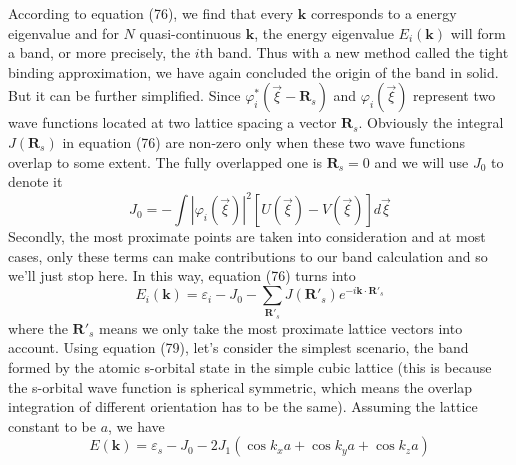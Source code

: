 \documentclass{article}
\begin{document}
According to equation (76), we find that every $\mathbf{k}$ corresponds to a energy eigenvalue and for $N$ quasi-continuous $\mathbf{k}$, the energy eigenvalue $E_i(\mathbf{k})$ will form a band, or more precisely, the $i$th band. Thus with a new method called the tight binding approximation, we have again concluded the origin of the band in solid. But it can be further simplified. Since $\varphi_i^*(\vec\xi-\mathbf{R}_s)$ and $\varphi_i(\vec\xi)$ represent two wave functions located at two lattice spacing a vector $\mathbf{R}_s$. Obviously the integral $J(\mathbf{R}_s)$ in equation (76) are non-zero only when these two wave functions overlap to some extent. The fully overlapped one is $\mathbf{R}_s=0$ and we will use $J_0$ to denote it\begin{equation}
    J_0=-\int|\varphi_i(\vec\xi)|^2[U(\vec\xi)-V(\vec\xi)]d\vec\xi
\end{equation}
Secondly, the most proximate points are taken into consideration and at most cases, only these terms can make contributions to our band calculation and so we'll just stop here. In this way, equation (76) turns into\begin{equation}
    E_i(\mathbf{k})=\varepsilon_i-J_0-\sum_{\mathbf{R}'_s}J(\mathbf{R}'_s)e^{-i\mathbf{k}\cdot\mathbf{R}'_s}
\end{equation}
where the $\mathbf{R}'_s$ means we only take the most proximate lattice vectors into account. Using equation (79), let's consider the simplest scenario, the band formed by the atomic s-orbital state in the simple cubic lattice (this is because the s-orbital wave function is spherical symmetric, which means the overlap integration of different orientation has to be the same). Assuming the lattice constant to be $a$, we have\begin{equation}
    E(\mathbf{k})=\varepsilon_s-J_0-2J_1(\cos{k_xa}+\cos{k_ya}+\cos{k_za})
\end{equation}
\end{document}
